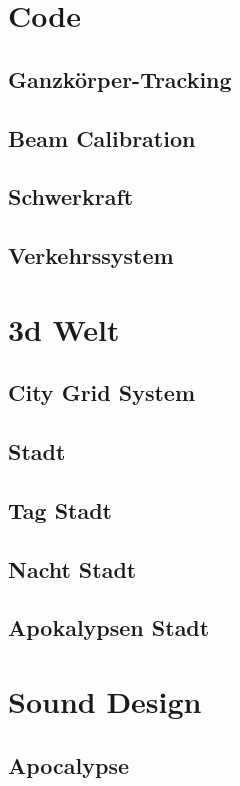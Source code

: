 \section{Code}\label{sec:code}
\subsection{Ganzkörper-Tracking}\label{subsec:full-body-tracking}
\subsection{Beam Calibration}\label{subsec:beam-calibration}
\subsection{Schwerkraft}\label{subsec:gravity}
\subsection{Verkehrssystem}\label{subsec:traffic-system}
\section{3d Welt}\label{sec:3d-world}
\subsection{City Grid System}\label{subsec:city-grid-system}
\subsection{Stadt}\label{subsec:city}
\subsection{Tag Stadt}\label{subsec:day-city}
\subsection{Nacht Stadt}\label{subsec:night-city}
\subsection{Apokalypsen Stadt}\label{subsec:apocalypse-city}
\section{Sound Design}\label{sec:sound}
\subsection{Apocalypse}\label{subsec:apocalypse-background-sound}
